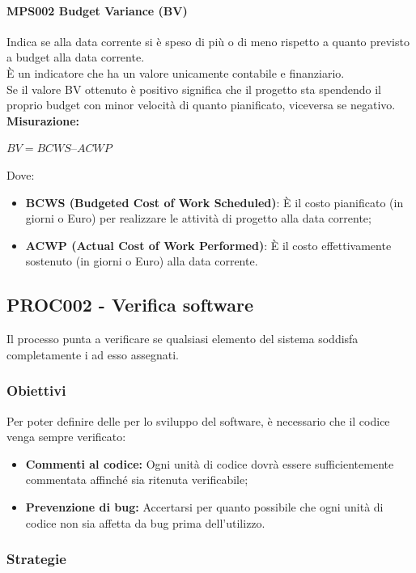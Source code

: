 \documentclass[NormeDiProgetto.tex]{subfiles}
\begin{document}
	
	\paragraph{MPS002 Budget Variance (BV)}
	Indica se alla data corrente si è speso di più o di meno rispetto a quanto previsto a budget alla data corrente.\\
	È un indicatore che ha un valore unicamente contabile e finanziario.\\
	Se il valore BV ottenuto è positivo significa che il progetto sta spendendo il proprio budget con minor velocità di quanto pianificato, viceversa se negativo.\\
	\textbf{Misurazione:}
	\begin{center}
		$ BV = BCWS – ACWP $
	\end{center}
	Dove: \begin{itemize}
		\item \textbf{BCWS (Budgeted Cost of Work Scheduled)}: \`{E} il costo pianificato (in giorni o Euro) per realizzare le attività di progetto alla data corrente;
		\item \textbf{ACWP (Actual Cost of Work Performed)}: \`{E} il costo effettivamente sostenuto (in giorni o Euro) alla data corrente.
	\end{itemize}
	
	\subsection{PROC002 - Verifica software}
	Il processo punta a verificare se qualsiasi elemento del sistema soddisfa completamente i  ad esso assegnati.
	\subsubsection{Obiettivi}
	Per poter definire delle  per lo sviluppo del software, è necessario che il codice venga sempre verificato:
	\begin{itemize}
		\item \textbf{Commenti al codice:} Ogni unità di codice dovrà essere sufficientemente commentata affinché sia ritenuta verificabile;
		\item \textbf{Prevenzione di bug:} Accertarsi per quanto possibile che ogni unità di codice non sia affetta da bug prima dell'utilizzo.
	\end{itemize}
	\subsubsection{Strategie}
	
\end{document}
